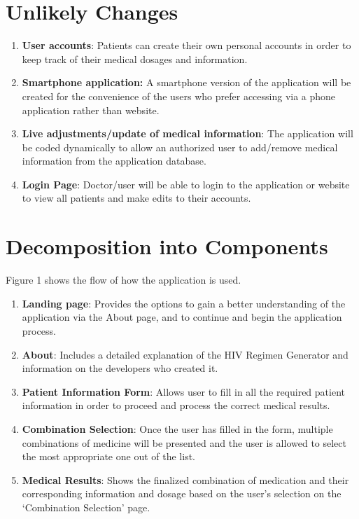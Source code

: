 \documentclass[12pt]{article}
\begin{document}
\section{Unlikely Changes}
\begin{enumerate}
\item \textbf{User accounts}: Patients can create their own personal accounts in order to keep track of their medical dosages and information.
\item \textbf{Smartphone application:} A smartphone version of the application will be created for the convenience of the users who prefer accessing via a phone application rather than website.
\item \textbf{Live adjustments/update of medical information}: The application will be coded dynamically to allow an authorized user to add/remove medical information from the application database.
\item \textbf{Login Page}: Doctor/user will be able to login to the application or website to view all patients and make edits to their accounts.
\end{enumerate}

\section{Decomposition into Components}
Figure 1 shows the flow of how the application is used.
\begin{enumerate}
\item \textbf{Landing page}: Provides the options to gain a better understanding of the application via the About page, and to continue and begin the application process.
\item \textbf{About}: Includes a detailed explanation of the HIV Regimen Generator and information on the developers who created it.
\item \textbf{Patient Information Form}: Allows user to fill in all the required patient information in order to proceed and process the correct medical results.
\item \textbf{Combination Selection}: Once the user has filled in the form, multiple combinations of medicine will be presented and the user is allowed to select the most appropriate one out of the list.
\item \textbf{Medical Results}: Shows the finalized combination of medication and their corresponding information and dosage based on the user’s selection on the ‘Combination Selection’ page.
\end{enumerate}
\end{document}
